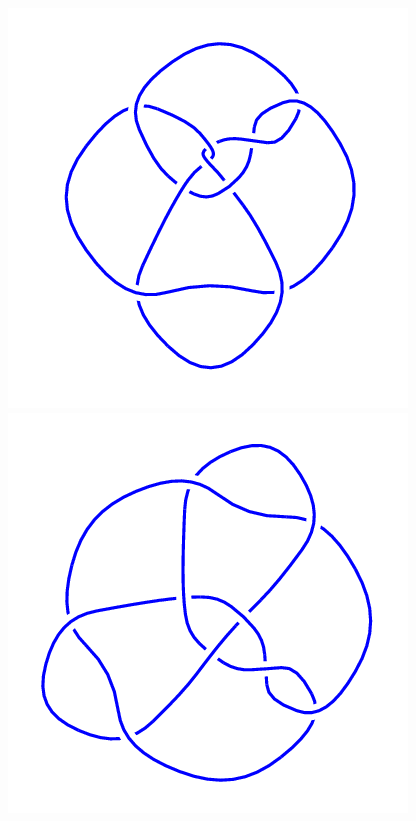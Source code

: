 \begin{figure}[H]
\begin{minipage}[b]{.18\linewidth}
    \end{minipage}
    \begin{minipage}[b]{.18\linewidth}
        \centering
        \includegraphics[width=\linewidth]{../data/9_38.png}
    \end{minipage}
    \begin{minipage}[b]{.18\linewidth}
        \centering
        \includegraphics[width=\linewidth]{../data/9_39.png}

\end{minipage}
\end{figure}
